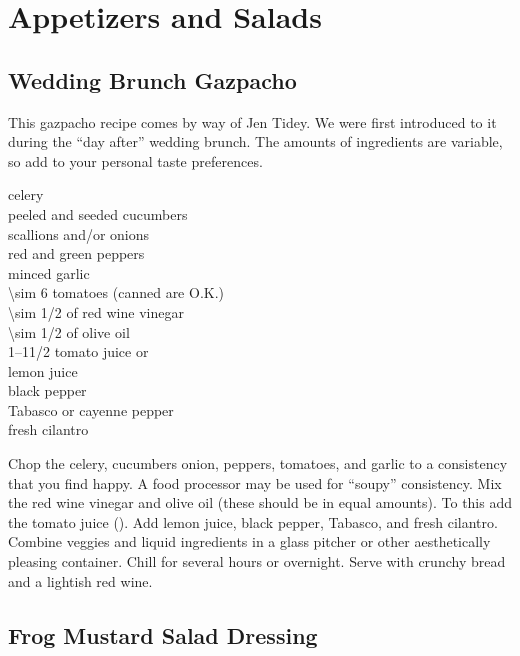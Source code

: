 \chapter{Appetizers and Salads}

\section{Wedding Brunch Gazpacho}

\begin{open}
  This gazpacho recipe comes by way of Jen Tidey.  We were first
  introduced to it during the ``day after'' wedding brunch.  The amounts of
  ingredients are variable, so add to your personal taste preferences.
\end{open}
\begin{ingredients}
  celery \\
  peeled and seeded cucumbers \\
  scallions and/or onions \\
  red and green peppers \\
  minced garlic \\
  \num{\sim 6} tomatoes (canned are O.K.) \\
  \SI{\sim 1/2}{\cup} of red wine vinegar \\
  \SI{\sim 1/2}{\cup} of olive oil \\
  \numrange{1}{1}\SI{1/2}{\cup} tomato juice or  \\
  lemon juice \\
  black pepper \\
  Tabasco or cayenne pepper \\
  fresh cilantro
\end{ingredients}
Chop the celery, cucumbers onion, peppers, tomatoes, and garlic to a
consistency that you find happy.  A food processor may be used for ``soupy''
consistency.  Mix the red wine vinegar and olive oil (these should be in equal
amounts).  To this add the tomato juice ().  Add lemon juice, black
pepper, Tabasco, and fresh cilantro.  Combine veggies and liquid ingredients
in a glass pitcher or other aesthetically pleasing container.  Chill for
several hours or overnight.  Serve with crunchy bread and a lightish red wine.

\section{Frog Mustard Salad Dressing}


